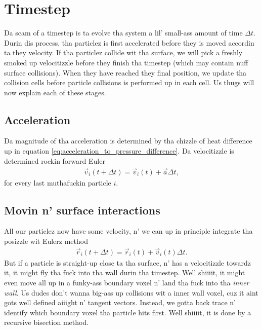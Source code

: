 \section{Timestep}
\label{sec:dsmc_implementation_timestep}
Da scam of a timestep is ta evolve tha system a lil' small-ass amount of time $\Delta t$. Durin dis process, tha particlez is first accelerated before they is moved accordin ta they velocity. If tha particlez collide wit tha surface, we will pick a freshly smoked up velocitizzle before they finish tha timestep (which may contain nuff surface collisions). When they have reached they final position, we update tha collision cells before particle collisions is performed up in each cell. Us thugs will now explain each of these stages.
\subsection{Acceleration}
Da magnitude of tha acceleration is determined by tha chizzle of heat difference up in equation \eqref{eq:acceleration_to_pressure_difference}. Da velocitizzle is determined rockin forward Euler
\begin{align}
    \vec v_i(t + \Delta t) = \vec v_i(t) + \vec a\Delta t,
\end{align}
for every last muthafuckin particle $i$. 
\subsection{Movin n' surface interactions}
All our particlez now have some velocity, n' we can up in principle integrate tha posizzle wit Eulerz method
\begin{align}
    \vec r_i(t + \Delta t) = \vec r_i(t) + \vec v_i(t)\Delta t.
\end{align}
But if a particle is straight-up close ta tha surface, n' has a velocitizzle towardz it, it might fly tha fuck into tha wall durin tha timestep. Well shiiiit, it might even move all up in a funky-ass boundary voxel n' land tha fuck into tha \textit{inner wall}. Us dudes don't wanna big-ass up collisions wit a inner wall voxel, cuz it aint gots well defined aiiight n' tangent vectors. Instead, we gotta back trace n' identify which boundary voxel tha particle hits first. Well shiiiit, it is done by a recursive bisection method.


